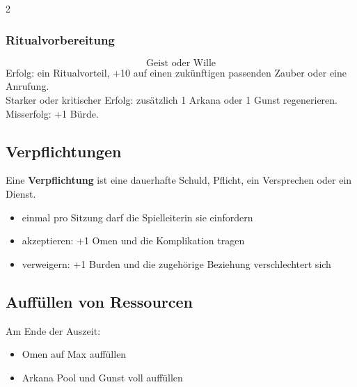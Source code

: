 \begin{multicols*}{2}
\subsubsection{Ritualvorbereitung}
\[
\text{Geist oder Wille}
\]
Erfolg: ein Ritualvorteil, +10 auf einen zukünftigen passenden Zauber oder eine Anrufung.\\
Starker oder kritischer Erfolg: zusätzlich 1 Arkana oder 1 Gunst regenerieren.\\
Misserfolg: +1 Bürde.

\subsection{Verpflichtungen}
Eine \textbf{Verpflichtung} ist eine dauerhafte Schuld, Pflicht, ein Versprechen oder ein Dienst.
\begin{itemize}[leftmargin=*]
\item einmal pro Sitzung darf die Spielleiterin sie einfordern
\item akzeptieren: +1 Omen und die Komplikation tragen
\item verweigern: +1 Burden und die zugehörige Beziehung verschlechtert sich
\end{itemize}

\subsection{Auffüllen von Ressourcen}
Am Ende der Auszeit:
\begin{itemize}[leftmargin=*]
\item Omen auf Max auffüllen
\item Arkana Pool und Gunst voll auffüllen
\end{itemize}

\end{multicols*}
